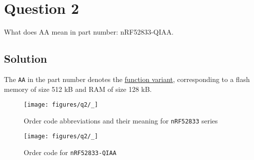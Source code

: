 \section*{Question 2}

What does AA mean in part number: nRF52833-QIAA.\@

\subsection*{Solution}

The \texttt{AA} in the part number denotes the \underline{function variant}, corresponding to a flash memory of size 512 kB and RAM of size 128 kB.

\vspace*{0.5em}
\begin{figure}[htb]
    \centering
    \texttt{[image: figures/q2/\_]}
    \vspace*{-3.5em}
    \caption{Order code abbreviations and their meaning for \texttt{nRF52833} series}
\end{figure}

\vspace*{-0.5em}
\begin{figure}[htb]
    \centering
    \texttt{[image: figures/q2/\_]}
    \vspace*{-2em}
    \caption{Order code for \texttt{nRF52833-QIAA}}
\end{figure}
